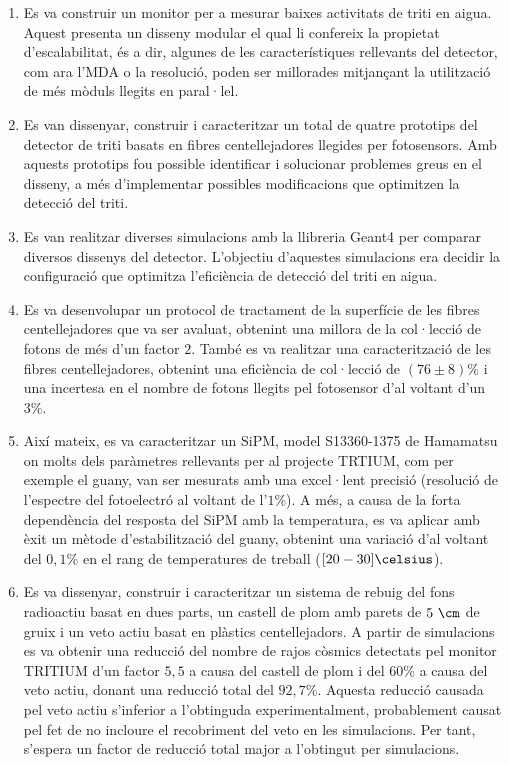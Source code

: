 \begin{enumerate}

\item{} Es va construir un monitor per a mesurar baixes activitats de triti en aigua. Aquest presenta un disseny modular el qual li confereix la propietat d'escalabilitat, és a dir, algunes de les característiques rellevants del detector, com ara l'MDA o la resolució, poden ser millorades mitjançant la utilització de més mòduls llegits en paral·lel.

\item{} Es van dissenyar, construir i caracteritzar un total de quatre prototips del detector de triti basats en fibres centellejadores llegides per fotosensors. Amb aquests prototips fou possible identificar i solucionar problemes greus en el disseny, a més d'implementar possibles modificacions que optimitzen la detecció del triti.

\item{} Es van realitzar diverses simulacions amb la llibreria Geant4 per comparar diversos dissenys del detector. L'objectiu d'aquestes simulacions era decidir la configuració que optimitza l'eficiència de detecció del triti en aigua.

\item{} Es va desenvolupar un protocol de tractament de la superfície de les fibres centellejadores que va ser avaluat, obtenint una millora de la col·lecció de fotons de més d'un factor $2$. També es va realitzar una caracterització de les fibres centellejadores, obtenint una eficiència de col·lecció de $(76 \pm 8)\%$ i una incertesa en el nombre de fotons llegits pel fotosensor d'al voltant d'un $3\%$.

\item{} Així mateix, es va caracteritzar un SiPM, model S13360-1375 de Hamamatsu on molts dels paràmetres rellevants per al projecte TRTIUM, com per exemple el guany, van ser mesurats amb una excel·lent precisió (resolució de l'espectre del fotoelectró al voltant de l'$1\%$). A més, a causa de la forta dependència del resposta del SiPM amb la temperatura, es va aplicar amb èxit un mètode d'estabilització del guany, obtenint una variació d'al voltant del $0,1\%$ en el rang de temperatures de treball ($[20-30]\celsius$).

\item{} Es va dissenyar, construir i caracteritzar un sistema de rebuig del fons radioactiu basat en dues parts, un castell de plom amb parets de $5~\cm$ de gruix i un veto actiu basat en plàstics centellejadors. A partir de simulacions es va obtenir una reducció del nombre de rajos còsmics detectats pel monitor TRITIUM d'un factor $5,5$ a causa del castell de plom i del $60\%$ a causa del veto actiu, donant una reducció total del $92,7\%$. Aquesta reducció causada pel veto actiu s'inferior a l'obtinguda experimentalment, probablement causat pel fet de no incloure el recobriment del veto en les simulacions. Per tant, s'espera un factor de reducció total major a l'obtingut per simulacions.


\end{enumerate}
